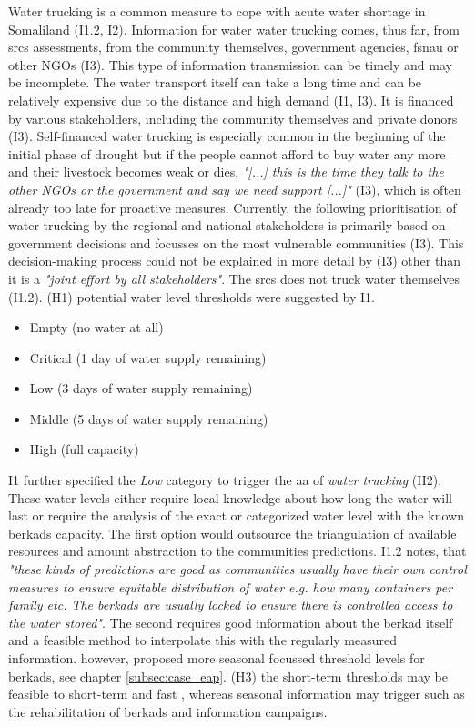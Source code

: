 Water trucking is a common measure to cope with acute water shortage in Somaliland (I1.2, I2). Information for water water trucking comes, thus far, from \acrshort{srcs} assessments, from the community themselves, government agencies, \acrshort{fsnau} or other NGOs (I3). This type of information transmission can be timely and may be incomplete. The water transport itself can take a long time and can be relatively expensive due to the distance and high demand (I1, I3). It is financed by various stakeholders, including the community themselves and private donors (I3). Self-financed water trucking is especially common in the beginning of the initial phase of drought but if the people cannot afford to buy water any more and their livestock becomes weak or dies, \textit{"[...] this is the time they talk to the other NGOs or the government and say we need support [...]"} (I3), which is often already too late for proactive measures. Currently, the following prioritisation of water trucking by the regional and national stakeholders is primarily based on government decisions and focusses on the most vulnerable communities (I3). This decision-making process could not be explained in more detail by (I3) other than it is a \textit{"joint effort by all stakeholders"}. The \acrshort{srcs} does not truck water themselves (I1.2).\newline
(H1) potential water level thresholds were suggested by I1.
\begin{itemize}
    \item Empty (no water at all)
    \item Critical (1 day of water supply remaining)
    \item Low (3 days of water supply remaining)
    \item Middle (5 days of water supply remaining)
    \item High (full capacity)
\end{itemize}
I1 further specified the \textit{Low} category to trigger the \acrshort{aa} of \textit{water trucking} (H2). These water levels either require local knowledge about how long the water will last or require the analysis of the exact or categorized water level with the known berkads capacity. The first option would outsource the triangulation of available resources and amount abstraction to the communities predictions. I1.2 notes, that \textit{"these kinds of predictions are good as communities usually have their own control measures to ensure equitable distribution of water e.g. how many containers per family etc. The berkads are usually locked to ensure there is controlled access to the water stored"}. The second requires good information about the berkad itself and a feasible method to interpolate this with the regularly measured information. \Textcite{gualazziniEWEAEarlyWarning2021} however, proposed more seasonal focussed threshold levels for berkads, see chapter \ref{subsec:case_eap}. (H3) the short-term thresholds may be feasible to short-term and fast , whereas seasonal information may trigger  such as the rehabilitation of berkads and information campaigns.

